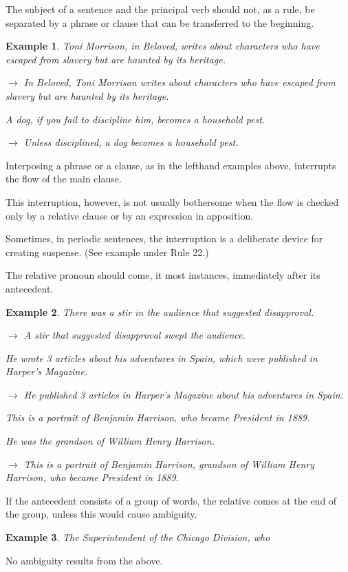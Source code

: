 \documentclass{book}
\numberwithin{equation}{section}
\newtheorem{example}{Example}[chapter]
\begin{document}
%
The subject of a sentence and the principal verb should not, as a rule, be separated by a phrase or clause that can be transferred to the beginning.
\begin{example}
    Toni Morrison, in \emph{Beloved}, writes about characters who have escaped from slavery but are haunted by its heritage.
    
    $\to$ In \emph{Beloved}, Toni Morrison writes about characters who have escaped from slavery but are haunted by its heritage.
    
    A dog, if you fail to discipline him, becomes a household pest.
    
    $\to$ Unless disciplined, a dog becomes a household pest.
\end{example}
Interposing a phrase or a clause, as in the lefthand examples above, interrupts the flow of the main clause.

This interruption, however, is not usually bothersome when the flow is checked only by a relative clause or by an expression in apposition.

Sometimes, in periodic sentences, the interruption is a deliberate device for creating suspense. (See example under Rule 22.)

%
The relative pronoun should come, it most instances, immediately after its antecedent.
\begin{example}
    There was a stir in the audience that suggested disapproval.
    
    $\to$ A stir that suggested disapproval swept the audience.
    
    He wrote 3 articles about his adventures in Spain, which were published in \emph{Harper's Magazine}.
    
    $\to$ He published 3 articles in \emph{Harper's Magazine} about his adventures in Spain.
    
    This is a portrait of Benjamin Harrison, who became President in 1889.
    
    He was the grandson of William Henry Harrison.
    
    $\to$ This is a portrait of Benjamin Harrison, grandson of William Henry Harrison, who became President in 1889.
\end{example}
If the antecedent consists of a group of words, the relative comes at the end of the group, unless this would cause ambiguity.
\begin{example}
    The Superintendent of the Chicago Division, who
\end{example}
No ambiguity results from the above.
\end{document}
